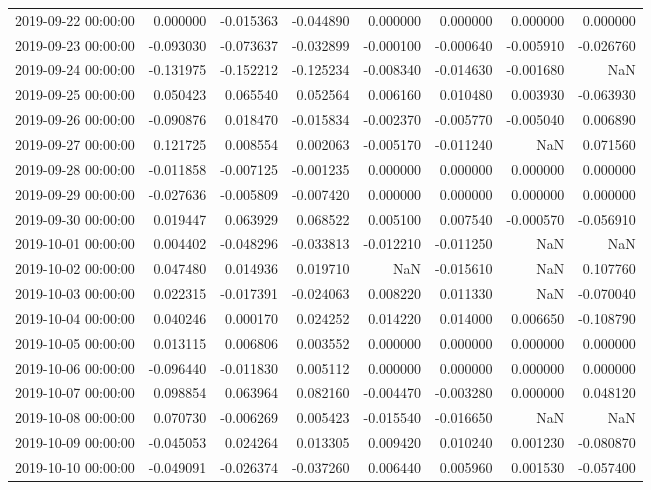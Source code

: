 \begin{tabular}{lrrrrrrr}
2019-09-22 00:00:00 & 0.000000 & -0.015363 & -0.044890 & 0.000000 & 0.000000 & 0.000000 & 0.000000 \\
2019-09-23 00:00:00 & -0.093030 & -0.073637 & -0.032899 & -0.000100 & -0.000640 & -0.005910 & -0.026760 \\
2019-09-24 00:00:00 & -0.131975 & -0.152212 & -0.125234 & -0.008340 & -0.014630 & -0.001680 & NaN \\
2019-09-25 00:00:00 & 0.050423 & 0.065540 & 0.052564 & 0.006160 & 0.010480 & 0.003930 & -0.063930 \\
2019-09-26 00:00:00 & -0.090876 & 0.018470 & -0.015834 & -0.002370 & -0.005770 & -0.005040 & 0.006890 \\
2019-09-27 00:00:00 & 0.121725 & 0.008554 & 0.002063 & -0.005170 & -0.011240 & NaN & 0.071560 \\
2019-09-28 00:00:00 & -0.011858 & -0.007125 & -0.001235 & 0.000000 & 0.000000 & 0.000000 & 0.000000 \\
2019-09-29 00:00:00 & -0.027636 & -0.005809 & -0.007420 & 0.000000 & 0.000000 & 0.000000 & 0.000000 \\
2019-09-30 00:00:00 & 0.019447 & 0.063929 & 0.068522 & 0.005100 & 0.007540 & -0.000570 & -0.056910 \\
2019-10-01 00:00:00 & 0.004402 & -0.048296 & -0.033813 & -0.012210 & -0.011250 & NaN & NaN \\
2019-10-02 00:00:00 & 0.047480 & 0.014936 & 0.019710 & NaN & -0.015610 & NaN & 0.107760 \\
2019-10-03 00:00:00 & 0.022315 & -0.017391 & -0.024063 & 0.008220 & 0.011330 & NaN & -0.070040 \\
2019-10-04 00:00:00 & 0.040246 & 0.000170 & 0.024252 & 0.014220 & 0.014000 & 0.006650 & -0.108790 \\
2019-10-05 00:00:00 & 0.013115 & 0.006806 & 0.003552 & 0.000000 & 0.000000 & 0.000000 & 0.000000 \\
2019-10-06 00:00:00 & -0.096440 & -0.011830 & 0.005112 & 0.000000 & 0.000000 & 0.000000 & 0.000000 \\
2019-10-07 00:00:00 & 0.098854 & 0.063964 & 0.082160 & -0.004470 & -0.003280 & 0.000000 & 0.048120 \\
2019-10-08 00:00:00 & 0.070730 & -0.006269 & 0.005423 & -0.015540 & -0.016650 & NaN & NaN \\
2019-10-09 00:00:00 & -0.045053 & 0.024264 & 0.013305 & 0.009420 & 0.010240 & 0.001230 & -0.080870 \\
2019-10-10 00:00:00 & -0.049091 & -0.026374 & -0.037260 & 0.006440 & 0.005960 & 0.001530 & -0.057400 \\

\end{tabular}
